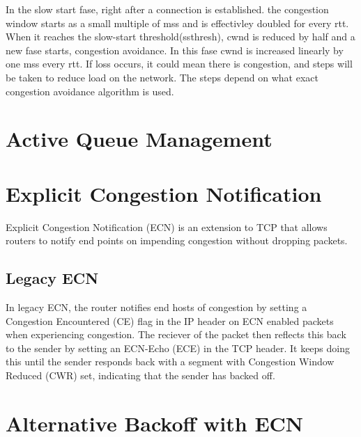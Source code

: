 In the slow start fase,  right after a connection is established. the congestion window starts as a small multiple of \gls{mss} and is effectivley doubled for every \gls{rtt}. When it reaches the slow-start threshold(ssthresh), \gls{cwnd} is reduced by half and a new fase starts, congestion avoidance. In this fase \gls{cwnd} is increased linearly by one \gls{mss} every \gls{rtt}. If loss occurs, it could mean there is congestion, and steps will be taken to reduce load on the network. The steps depend on what exact congestion avoidance algorithm is used.

\section{Active Queue Management}

\section{Explicit Congestion Notification}
Explicit Congestion Notification (ECN) is an extension to TCP that allows routers to notify end points on impending congestion without dropping packets.

\subsection{Legacy ECN}
In legacy ECN, the router notifies end hosts of congestion by setting a Congestion Encountered (CE) flag in the IP header on ECN enabled packets when experiencing congestion. The reciever of the packet then reflects this back to the sender by setting an ECN-Echo (ECE) in the TCP header. It keeps doing this until the sender responds back with a segment with Congestion Window Reduced (CWR) set, indicating that the sender has backed off.


\section{Alternative Backoff with ECN}

